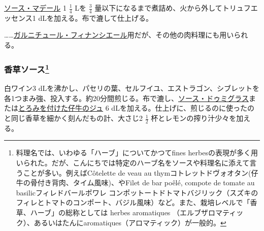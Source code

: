 \begin{recette}


\protect\hyperlink{sauce-madere}{ソース・マデール} 1 \(\frac{1}{4}\) Lを
\(\frac{3}{4}\) 量以下になるまで煮詰め、火から外してトリュフエッセンス1
dLを加える。布で漉して仕上げる。

\ldots{}\ldots{}\protect\hyperlink{garniture-financiere}{ガルニチュール・フィナンシエール}用だが、その他の肉料理にも用いられる。

\atoaki{}

\hypertarget{sauce-aux-fines-herbes}{%
\subsubsection[香草ソース]{\texorpdfstring{香草ソース\footnote{料理名では、いわゆる「ハーブ」についてかつてfines
  herbesの表現が多く用いられた。だが、こんにちでは特定のハーブ名をソースや料理名に添えて言うことが多い。例えばCôtelette
  de veau au
  thymコトレットドヴォオタン(仔牛の骨付き背肉、タイム風味)、やFilet de
  bar poêlé, compote de tomate au basilicフィレドバールポワレ
  コンポットートドトマトバジリック（スズキのフィレとトマトのコンポート、バジル風味）など。また、栽培レベルで「香草、ハーブ」の総称としては
  herbes aromatiques
  （エルブザロマティック）、あるいはたんにaromatiques（アロマティック）が一般的。}}{香草ソース}}\label{sauce-aux-fines-herbes}}


 

白ワイン3
dLを沸かし、パセリの葉、セルフイユ、エストラゴン、シブレットを各1つまみ強、投入する。約20分間煎じる。布で漉し、\protect\hyperlink{sauce-demi-glace}{ソース・ドゥミグラス}または\protect\hyperlink{jus-de-veau-lie}{とろみを付けた仔牛のジュ}
6
dLを加える。仕上げに、煎じるのに使ったのと同じ香草を細かく刻んだもの計、大さじ2
\(\frac{1}{2}\) 杯とレモンの搾り汁少々を加える。


\end{recette}

